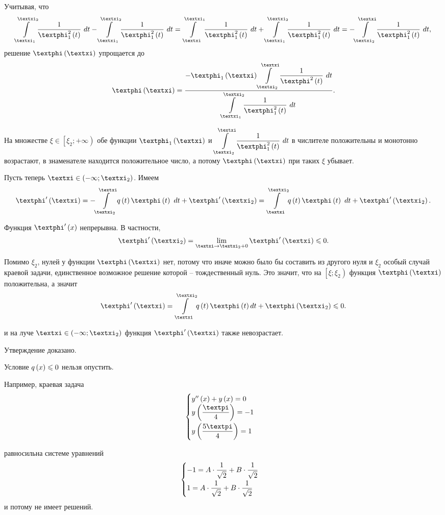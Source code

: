 \documentclass[a5paper,10pt]{article}
\begin{document}
Учитывая, что
$$\tintlim{\xi_{1}}{\xi_{2}} {\frac {1} {\phi_{1}^{2} \br{t}} \ dt} - \tintlim{\xi_{1}}{\xi_{2}} {\frac {1} {\phi_{1}^{2} \br{t}} \ dt}
= \tintlim{\xi}{\xi_{1}} {\frac {1} {\phi_{1}^{2} \br{t}} \ dt} + \tintlim{\xi_{1}}{\xi_{2}} {\frac {1} {\phi_{1}^{2} \br{t}} \ dt}
= -\tintlim{\xi_{2}}{\xi} {\frac {1} {\phi_{1}^{2} \br{t}} \ dt},$$
решение $\phi\br{\xi}$ упрощается до
$$\phi\br{\xi} = \frac {-\phi_{1} \br{\xi} \tintlim{\xi_{2}}{\xi} {\frac {1} {\phi^{2} \br{t}} \ dt}} {\tintlim{\xi_{1}}{\xi_{2}} {\frac {1} {\phi_{1}^{2} \br{t}} \ dt}}.$$

На множестве $\xi \in \left[\xi_{2}; +\infty \right)$ обе функции $\phi_{1}\br{\xi}$ и $\tintlim{\xi_{2}}{\xi} {\frac {1} {\phi_{1}^{2} \br{t}} \ dt}$ в числителе положительны и монотонно возрастают, в знаменателе находится положительное число, а потому $\phi\br{\xi}$ при таких $\xi$ убывает.

Пусть теперь $\xi \in \br{-\infty; \xi_{2}}$. Имеем
$$\phi'\br{\xi} = -\tintlim{\xi_{2}}{\xi} { q\br{t} \phi\br{t} \ dt} + \phi'\br{\xi_{2}}
= \tintlim{\xi}{\xi_{2}} { q\br{t} \phi\br{t} \ dt} + \phi'\br{\xi_{2}}.$$

Функция $\phi'\br{x}$ непрерывна. В частности, 
$$\phi'\br{\xi_{2}} = \lim_{\xi \to \xi_{2} + 0} \phi'\br{\xi} \le 0.$$

Помимо $\xi_{2}$, нулей у функции $\phi\br{\xi}$ нет, потому что иначе можно было бы составить из другого нуля и $\xi_{2}$ особый случай краевой задачи, единственное возможное решение которой -- тождественный нуль. Это значит, что на $\left[\xi; \xi_{2}\right)$ функция $\phi\br{\xi}$ положительна, а значит
$$\phi'\br{\xi} = \tintlim{\xi}{\xi_{2}} { q\br{t} \phi\br{t} dt} + \phi\br{\xi_{2}} \le 0.$$

и на луче $\xi \in \br{-\infty; \xi_{2}}$ функция $\phi'\br{\xi}$ также невозрастает.

Утверждение доказано.

\begin{remark} 
Условие $q\left(x\right) \leqslant 0$ нельзя опустить.
\end{remark}

Например, краевая задача
$$\begin{cases}
    y''\br{x} + y\br{x} = 0 \\
    y\br{\dfrac {\pi} {4}} = -1 \vspace{0.1cm} \\
    y\br{\dfrac {5\pi} {4}} = 1
\end{cases}$$

равносильна системе уравнений
$$\begin{cases}
    -1 = A \cdot \dfrac {1} {\sqrt{2}} + B \cdot \dfrac {1} {\sqrt{2}} \vspace{0.1cm} \\
    1 = A \cdot \dfrac {1} {\sqrt{2}} + B \cdot \dfrac {1} {\sqrt{2}}
\end{cases}$$
и потому не имеет решений. 
\end{document}
